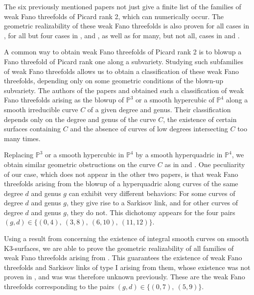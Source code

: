 \documentclass[english,11pt,reqno]{amsart}
\newcommand{\Pthree}{\mathbb{P}^3}
\newcommand{\Pfour}{\mathbb{P}^4}
\begin{document}
	The six previously mentioned papers not just give a finite list of the families of weak Fano threefolds of Picard rank 2, which can numerically occur. The geometric realizability of these weak Fano threefolds is also proven for all cases in \cite{Takeuchi-Weak_Fano_threefolds_del_Pezzo_fibration}, for all but four cases in \cite{Cutrone_Marshburn_Classification}, \cite{Arap_Cutrone_Marshburn_weak_Fano_threefolds_Existence} and \cite{Cutrone_Marshburn_Update}, as well as for many, but not all, cases in \cite{Weak_Fano_threefolds_I-Jahnke_Peternell_Radloff} and \cite{Weak_Fano_threefolds_II-Jahnke_Peternell_Radloff}. \par 
	A common way to obtain weak Fano threefolds of Picard rank 2 is to blowup a Fano threefold of Picard rank one along a subvariety. Studying such subfamilies of weak Fano threefolds allows us to obtain a classification of these weak Fano threefolds, depending only on some geometric conditions of the blown-up subvariety. The authors of the papers \cite{Blanc_Lamy_Weak_Fano_threefolds} and \cite{Blanc_Lamy_Cubic} obtained such a classification of weak Fano threefolds arising as the blowup of $\Pthree$ or a smooth hypercubic of $\Pfour$ along a smooth irreducible curve $C$ of a given degree and genus. Their classification depends only on the degree and genus of the curve $C$, the existence of certain surfaces containing $C$ and the absence of curves of low degrees intersecting $C$ too many times. \par 
	Replacing $\Pthree$ or a smooth hypercubic in $\Pfour$ by a smooth hyperquadric in $\Pfour$, we obtain similar geometric obstructions on the curve $C$ as in \cite{Blanc_Lamy_Cubic} and \cite{Blanc_Lamy_Weak_Fano_threefolds}. One peculiarity of our case, which does not appear in the other two papers, is that weak Fano threefolds arising from the blowup of a hyperquadric along curves of the same degree $d$ and genus $g$ can exhibit very different behaviors: For some curves of degree $d$ and genus $g$, they give rise to a Sarkisov link, and for other curves of degree $d$ and genus $g$, they do not. This dichotomy appears for the four pairs $(g,d)\in\{(0,4),\:(3,8),\:(6,10),\:(11,12)\}$. \par
	Using a result from \cite{Knutsen-Smooth_curves_on_projective_K3_surface} concerning the existence of integral smooth curves on smooth K3-surfaces, we are able to prove the geometric realizability of all families of weak Fano threefolds arising from . This guarantees the existence of weak Fano threefolds and Sarkisov links of type I arising from them, whose existence was not proven in \cite{Weak_Fano_threefolds_II-Jahnke_Peternell_Radloff}, and was was therefore unknown previously. These are the weak Fano threefolds corresponding to the pairs $(g,d)\in\{(0,7),\:(5,9)\}$.\par 
\end{document}
